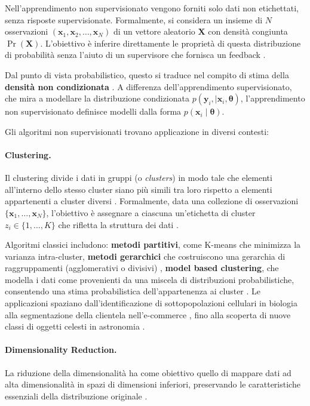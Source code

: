 Nell'apprendimento non supervisionato vengono forniti solo dati non etichettati, senza risposte supervisionate. Formalmente, si considera un insieme di $N$ osservazioni $(\mathbf{x}_1, \mathbf{x}_2, \dots, \mathbf{x}_N)$ 
di un vettore aleatorio $\mathbf{X}$ con densità congiunta $\Pr(\mathbf{X})$. L'obiettivo è inferire direttamente le proprietà di questa distribuzione di probabilità senza l'aiuto di un supervisore che fornisca un feedback \cite{hastie2009elements}.

Dal punto di vista probabilistico, questo si traduce nel compito di stima della \textbf{densità non condizionata} \cite{murphy2012}. A differenza dell'apprendimento supervisionato, che mira a modellare la distribuzione condizionata $p(\mathbf{y}_i, \mid \mathbf{x}_i, \boldsymbol{\theta})$, l'apprendimento non supervisionato definisce modelli dalla forma $p(\mathbf{x}_i \mid \boldsymbol{\theta})$.

Gli algoritmi non supervisionati trovano applicazione in diversi contesti:

\paragraph{Clustering.} Il clustering divide i dati in gruppi (o \textit{clusters}) in modo tale che elementi all'interno dello stesso cluster siano più simili tra loro rispetto a elementi appartenenti a cluster diversi  \cite[p.~424]{bishop2006pattern}. Formalmente, data una collezione di osservazioni $\{\mathbf{x}_1, \dots, \mathbf{x}_N\}$, 
l'obiettivo è assegnare a ciascuna un'e\-ti\-chet\-ta di cluster $z_i \in \{1, \dots, K\}$ che rifletta la struttura dei dati \cite{murphy2012}. 

Algoritmi classici includono: \textbf{metodi partitivi}, come K-means che minimizza la varianza intra-cluster, \textbf{metodi gerarchici} che costruiscono una gerarchia di raggruppamenti (agglomerativi o divisivi) \cite{hastie2009elements}, \textbf{model based clustering}, che modella i dati come provenienti da una miscela di distribuzioni probabilistiche, consentendo una stima probabilistica dell'appartenenza ai cluster \cite{murphy2012}. Le applicazioni spaziano dall'identificazione di sottopopolazioni cellulari in biologia \cite{lo2009automated} alla segmentazione della clientela nell'e-commerce \cite{berkhin2006survey}, fino alla scoperta di nuove classi di oggetti celesti in astronomia \cite{cheeseman1988autoclass}.

\paragraph{Dimensionality Reduction.} 
\label{sec:dimensionality_reduction}
La riduzione della dimensionalità ha come obiettivo quello di mappare dati ad alta dimensionalità in spazi di dimensioni inferiori, preservando le caratteristiche essenziali della distribuzione originale \cite[pp.~559-577]{bishop2006pattern}. 

